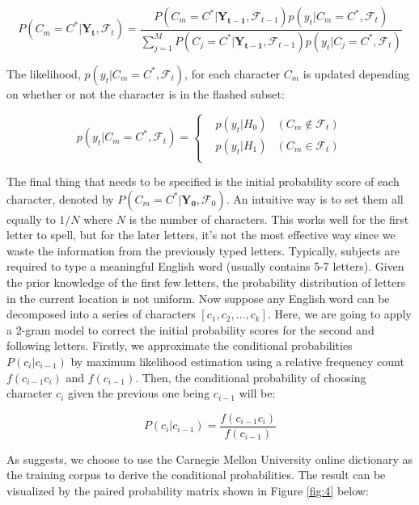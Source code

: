 \documentclass{article}
\begin{document}
\begin{equation} \label{eq:1}
	P(C_m = C^*|\mathbf{Y_t}, \mathcal{F}_t) = \frac{P(C_m = C^*|\mathbf{Y_{t-1}}, \mathcal{F}_{t-1})p(y_t|C_m = C^*, \mathcal{F}_t)}{\sum^M_{j=1}P(C_j = C^*|\mathbf{Y_{t-1}}, \mathcal{F}_{t-1})p(y_t|C_j = C^*, \mathcal{F}_t)}
\end{equation}

The likelihood, $p(y_t|C_m = C^*, \mathcal{F}_t)$, for each character $C_m$ is updated depending on whether or not the character is in the flashed subset:

\begin{equation} \label{eq:2}
	p(y_t|C_m = C^*, \mathcal{F}_t) = \left\{
	\begin{aligned}
		& p(y_t|H_0) & (C_m \notin \mathcal{F}_t) \\
		& p(y_t|H_1) & (C_m \in \mathcal{F}_t) \\
	\end{aligned} 
\right.
\end{equation}

The final thing that needs to be specified is the initial probability score of each character, denoted by $P(C_m = C^*|\mathbf{Y_0}, \mathcal{F}_0)$. An intuitive way is to set them all equally to $1/N$ where $N$ is the number of characters. This works well for the first letter to spell, but for the later letters, it's not the most effective way since we waste the information from the previously typed letters. Typically, subjects are required to type a meaningful English word (usually contains 5-7 letters). Given the prior knowledge of the first few letters, the probability distribution of letters in the current location is not uniform. Now suppose any English word can be decomposed into a series of characters $[c_1, c_2, ..., c_k]$. Here, we are going to apply a 2-gram model to correct the initial probability scores for the second and following letters. Firstly, we approximate the conditional probabilities $P(c_i|c_{i-1})$ by maximum likelihood estimation using a relative frequency count $f(c_{i-1}c_{i})$ and $f(c_{i-1})$. Then, the conditional probability of choosing character $c_i$ given the previous one being $c_{i-1}$ will be:

\begin{equation} \label{eq:3}
	P(c_i|c_{i-1}) = \frac{f(c_{i-1}c_{i})}{f(c_{i-1})}
\end{equation}
	
As \cite{mainsah2014utilizing} suggests, we choose to use the Carnegie Mellon University online dictionary as the training corpus to derive the conditional probabilities. The result can be visualized by the paired probability matrix shown in Figure \ref{fig:4} below:
\end{document}
